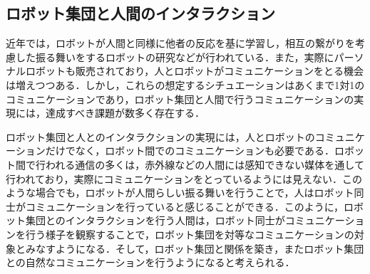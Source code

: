 \subsection{ロボット集団と人間のインタラクション}
\label{sec2.3.3}

近年では，ロボットが人間と同様に他者の反応を基に学習し，相互の繋がりを考慮した振る舞いをするロボットの研究などが行われている\cite{tekiou}．また，実際にパーソナルロボットも販売されており，人とロボットがコミュニケーションをとる機会は増えつつある\cite{rabot}．しかし，これらの想定するシチュエーションはあくまで1対1のコミュニケーションであり，ロボット集団と人間で行うコミュニケーションの実現には，達成すべき課題が数多く存在する．

ロボット集団と人とのインタラクションの実現には，人とロボットのコミュニケーションだけでなく，ロボット間でのコミュニケーションも必要である．ロボット間で行われる通信の多くは，赤外線などの人間には感知できない媒体を通して行われており，実際にコミュニケーションをとっているようには見えない．このような場合でも，ロボットが人間らしい振る舞いを行うことで，人はロボット同士がコミュニケーションを行っていると感じることができる．このように，ロボット集団とのインタラクションを行う人間は，ロボット同士がコミュニケーションを行う様子を観察することで，ロボット集団を対等なコミュニケーションの対象とみなすようになる．そして，ロボット集団と関係を築き，またロボット集団との自然なコミュニケーションを行うようになると考えられる．





\vspace{1cm}
\begin{figure}[!h]
 \begin{center}
  \centering
  \label{fig:kansei}
 \end{center}
\end{figure}

